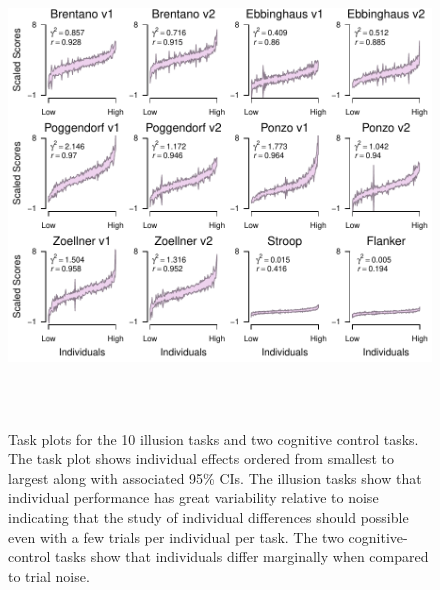 \documentclass[man, 12pt]{apa7} %
\begin{document}
\begin{figure}
    \centering  %
    \includegraphics[width=6in, height=5in]{_figs/task_plots.pdf}
    \caption{Task plots for the 10 illusion tasks and two cognitive control tasks.  The task plot shows individual effects ordered from smallest to largest along with associated 95\% CIs.  The illusion tasks show that individual performance has great variability relative to noise indicating that the study of individual differences should possible even with a few trials per individual per task.  The two cognitive-control tasks show that individuals differ marginally when compared to trial noise.}
    \label{fig:taskPlots}
\end{figure}
\end{document}
